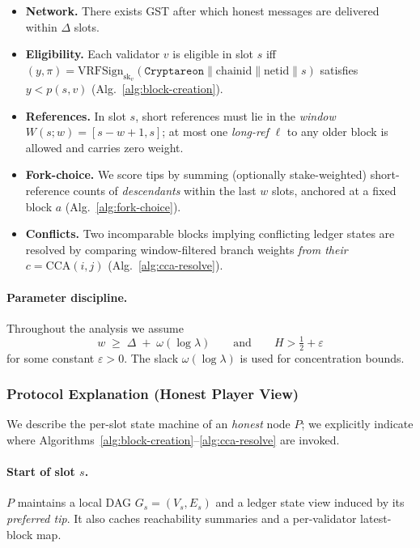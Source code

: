 \documentclass[11pt]{article}
\newcommand{\sk}{\ensuremath{\mathrm{sk}}\xspace}
\newcommand{\VRFSign}{\ensuremath{\mathrm{VRFSign}}\xspace}
\newcommand{\domsep}{\ensuremath{\mathtt{Cryptareon}}\xspace}
\newcommand{\chainid}{\ensuremath{\mathrm{chainid}}\xspace}
\newcommand{\netid}{\ensuremath{\mathrm{netid}}\xspace}
\newcommand{\CCA}{\ensuremath{\mathrm{CCA}}\xspace}
\begin{document}
\begin{itemize}
  \item \textbf{Network.} There exists GST after which honest messages are delivered within $\Delta$ slots.
  \item \textbf{Eligibility.} Each validator $v$ is eligible in slot $s$ iff $(y,\pi)=\VRFSign_{\sk_v}(\domsep\|\chainid\|\netid\|s)$ satisfies $y<p(s,v)$ (Alg.~\ref{alg:block-creation}).
  \item \textbf{References.} In slot $s$, short references must lie in the \emph{window} $W(s;w)=[s{-}w{+}1,s]$; at most one \emph{long-ref} $\ell$ to any older block is allowed and carries zero weight.
  \item \textbf{Fork-choice.} We score tips by summing (optionally stake-weighted) short-reference counts of \emph{descendants} within the last $w$ slots, anchored at a fixed block $a$ (Alg.~\ref{alg:fork-choice}).
  \item \textbf{Conflicts.} Two incomparable blocks implying conflicting ledger states are resolved by comparing window-filtered branch weights \emph{from their} $c=\CCA(i,j)$ (Alg.~\ref{alg:cca-resolve}).
\end{itemize}

\paragraph{Parameter discipline.} Throughout the analysis we assume
\begin{equation}
\label{eq:base-params}
w \;\ge\; \Delta \;+\; \omega(\log\lambda) \qquad\text{and}\qquad
H>\tfrac{1}{2}+\varepsilon
\end{equation}
for some constant $\varepsilon>0$. The slack $\omega(\log\lambda)$ is used for concentration bounds.

\subsubsection{Protocol Explanation (Honest Player View)}
\label{subsec:base-walkthrough}
We describe the per-slot state machine of an \emph{honest} node $P$; we explicitly indicate where Algorithms~\ref{alg:block-creation}–\ref{alg:cca-resolve} are invoked.


\paragraph{Start of slot $s$.}
$P$ maintains a local DAG $G_s=(V_s,E_s)$ and a ledger state view induced by its \emph{preferred tip}. It also caches reachability summaries and a per-validator latest-block map.
\end{document}
